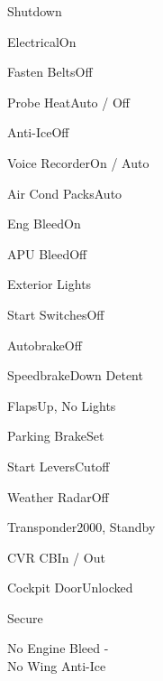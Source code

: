 \documentclass[sim-use, blue_items, halfpage]{checklist}
\begin{document}
\begin{checklist}{Shutdown}
  \item{Electrical}{On \blank}
  \item{Fasten Belts}{Off}
  \item{Probe Heat}{Auto / Off}
  \item{Anti-Ice}{Off}
  \item{Voice Recorder}{On / Auto}
  \item{Air Cond Packs}{Auto}
  \item{Eng Bleed}{On}
  \item{APU Bleed}{Off}
  \item{Exterior Lights}{\blank}
\end{checklist}

\begin{continuedchecklist}
  \item{Start Switches}{Off}
  \item{Autobrake}{Off}
  \item{Speedbrake}{Down Detent}
  \item{Flaps}{Up, No Lights}
  \item{Parking Brake}{Set}
  \item{Start Levers}{Cutoff}
  \item{Weather Radar}{Off}
  \item{Transponder}{2000, Standby}
  \item{CVR CB}{In / Out}
  \item{Cockpit Door}{Unlocked}
\end{continuedchecklist}

\begin{checklist}{Secure}
\end{checklist}

\clearpage

\begin{checklist}{No Engine Bleed -\\No Wing Anti-Ice}
\end{checklist}
\end{document}
